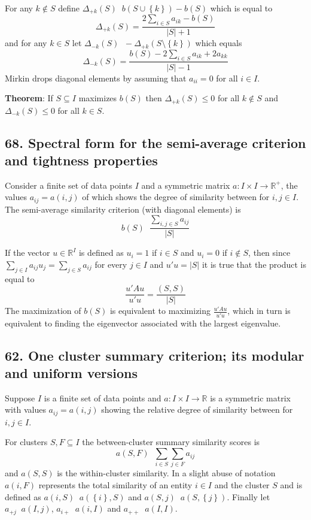 \documentclass[a4paper]{article}
\newcommand{\obj}[1]{{\left\{ #1 \right \}}}
\newcommand{\brac}[1]{{\left ( #1 \right )}}
\newcommand{\abs}[1]{{\left | #1 \right |}}
\newcommand{\Real}{\mathbb{R}}
\newcommand{\defn}{\mathop{\overset{\Delta}{=}}\nolimits}
\begin{document}
For any $k\notin S$ define $\Delta_{+k}(S)\defn b\brac{S\cup\obj{k}}-b(S)$ which is equal to \[\Delta_{+k}(S) = \frac{ 2 \sum_{i\in S} a_{ik} - b(S) }{\abs{S}+1}\] and for any $k\in S$ let $\Delta_{-k}(S) \defn -\Delta_{+k}\brac{S\setminus\obj{k}}$ which equals \[\Delta_{-k}(S) = \frac{b(S)- 2 \sum_{i\in S} a_{ik} + 2 a_{kk}}{\abs{S}-1}\] Mirkin drops diagonal elements by assuming that $a_{ii}=0$ for all $i\in I$.

\noindent\textbf{Theorem}: If $S\subseteq I$ maximizes $b(S)$ then $\Delta_{+k}(S) \leq 0$ for all $k\notin S$ and $\Delta_{-k}(S) \leq 0$ for all $k\in S$.


\subsection*{68. Spectral form for the semi-average criterion and tightness properties} %
\label{sub:question_68}
Consider a finite set of data points $I$ and a symmetric matrix $a:I\times I \to \Real^+$, the values $a_{ij} = a(i,j)$ of which shows the degree of similarity between for $i,j\in I$. The semi-average similarity criterion (with diagonal elements) is \[b(S) \defn \frac{\sum_{i,j\in S} a_{ij}}{\abs{S}}\]

If the vector $u\in\Real^I$ is defined as $u_i = 1$ if $i\in S$ and $u_i = 0$ if $i\notin S$, then since $\sum_{j\in I} a_{ij} u_j = \sum_{j\in S} a_{ij}$ for every $j\in I$ and $u'u = \abs{S}$ it is true that the product is equal to \[\frac{u'Au}{u'u} = \frac{(S,S)}{\abs{S}}\] The maximization of $b(S)$ is equivalent to maximizing $\frac{u'Au}{u'u}$, which in turn is equivalent to finding the eigenvector associated with the largest eigenvalue.



\subsection*{62. One cluster summary criterion; its modular and uniform versions} %
\label{sub:question_62}
Suppose $I$ is a finite set of data points and $a:I\times I \to \Real$ is a symmetric matrix with values $a_{ij} = a(i,j)$ showing the relative degree of similarity between for $i,j\in I$.

For clusters $S,F\subseteq I$ the between-cluster summary similarity scores is \[a(S,F)\defn \sum_{i\in S}\sum_{j\in F} a_{ij}\] and $a(S,S)$ is the within-cluster similarity. In a slight abuse of notation $a(i,F)$ represents the total similarity of an entity $i\in I$ and the cluster $S$ and is defined as $a(i,S)\defn a\brac{\obj{i},S}$ and $a(S,j) \defn a\brac{S,\obj{j}}$. Finally let $a_{+j} \defn a(I,j)$, $a_{i+} \defn a(i,I)$ and $a_{++} \defn a(I,I)$.
\end{document}
